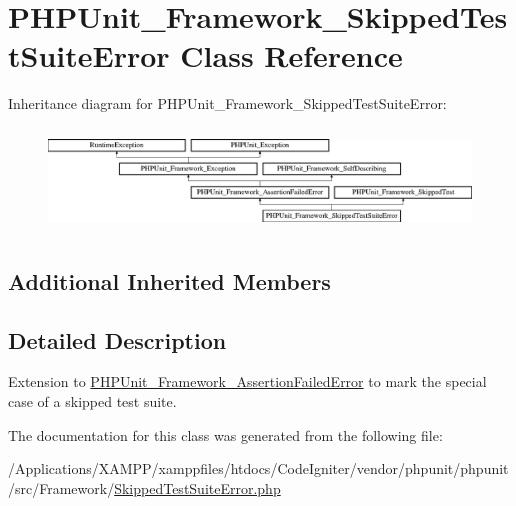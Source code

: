 \hypertarget{class_p_h_p_unit___framework___skipped_test_suite_error}{}\section{P\+H\+P\+Unit\+\_\+\+Framework\+\_\+\+Skipped\+Test\+Suite\+Error Class Reference}
\label{class_p_h_p_unit___framework___skipped_test_suite_error}
Inheritance diagram for P\+H\+P\+Unit\+\_\+\+Framework\+\_\+\+Skipped\+Test\+Suite\+Error\+:\begin{figure}[H]
\begin{center}
\leavevmode
\includegraphics[height=2.775713cm]{class_p_h_p_unit___framework___skipped_test_suite_error}
\end{center}
\end{figure}
\subsection*{Additional Inherited Members}


\subsection{Detailed Description}
Extension to \mbox{\hyperlink{class_p_h_p_unit___framework___assertion_failed_error}{P\+H\+P\+Unit\+\_\+\+Framework\+\_\+\+Assertion\+Failed\+Error}} to mark the special case of a skipped test suite. 

The documentation for this class was generated from the following file\+:\begin{DoxyCompactItemize}
\item 
/\+Applications/\+X\+A\+M\+P\+P/xamppfiles/htdocs/\+Code\+Igniter/vendor/phpunit/phpunit/src/\+Framework/\mbox{\hyperlink{_skipped_test_suite_error_8php}{Skipped\+Test\+Suite\+Error.\+php}}\end{DoxyCompactItemize}
